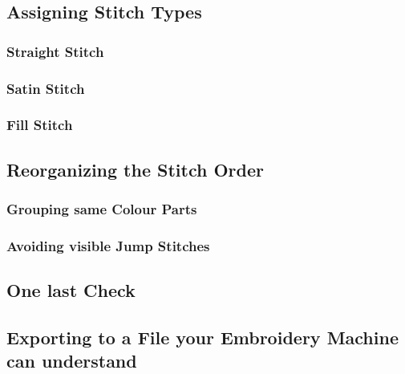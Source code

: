 \documentclass{article}
\begin{document}
        \subsection{Assigning Stitch Types}
            \subsubsection{Straight Stitch}
            \subsubsection{Satin Stitch}
            \subsubsection{Fill Stitch}
        
        \subsection{Reorganizing the Stitch Order}
            \subsubsection{Grouping same Colour Parts}
            \subsubsection{Avoiding visible Jump Stitches}
        
        \subsection{One last Check}
        
        \subsection{Exporting to a File your Embroidery Machine can understand}
\end{document}
